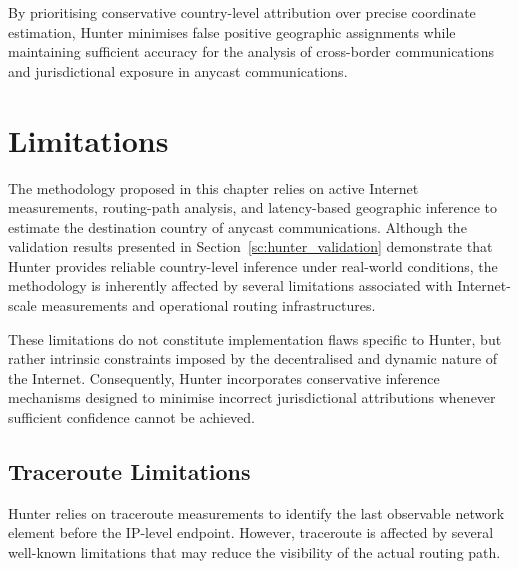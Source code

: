 By prioritising conservative country-level attribution over precise coordinate estimation, Hunter minimises false positive geographic assignments while maintaining sufficient accuracy for the analysis of cross-border communications and jurisdictional exposure in anycast communications.

\section{Limitations}
\label{sc:hunter_limitations}

The methodology proposed in this chapter relies on active Internet measurements, routing-path analysis, and latency-based geographic inference to estimate the destination country of anycast communications. Although the validation results presented in Section~\ref{sc:hunter_validation} demonstrate that Hunter provides reliable country-level inference under real-world conditions, the methodology is inherently affected by several limitations associated with Internet-scale measurements and operational routing infrastructures.

These limitations do not constitute implementation flaws specific to Hunter, but rather intrinsic constraints imposed by the decentralised and dynamic nature of the Internet. Consequently, Hunter incorporates conservative inference mechanisms designed to minimise incorrect jurisdictional attributions whenever sufficient confidence cannot be achieved.

\subsection{Traceroute Limitations}
\label{sc:hunter_limitations_traceroute}

Hunter relies on traceroute measurements to identify the last observable network element before the IP-level endpoint. However, traceroute is affected by several well-known limitations that may reduce the visibility of the actual routing path.

